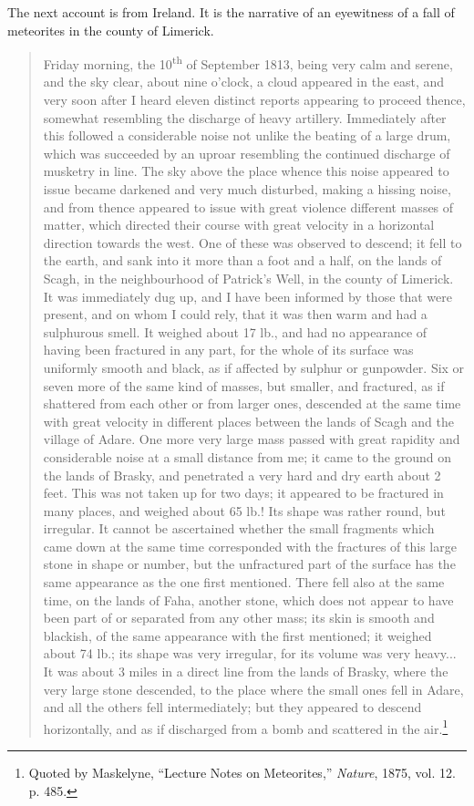 \documentclass[a4paper, 12pt, oneside, polutonikogreek, english]{article}
\begin{document}
The next account is from Ireland. It is the narrative of an eyewitness of a fall of meteorites in the county of Limerick.
\begin{quotation}
Friday morning, the 10\textsuperscript{th} of September 1813, being very calm and serene, and the sky clear, about nine o'clock, a cloud appeared in the east, and very soon after I heard eleven distinct reports appearing to proceed thence, somewhat resembling the discharge of heavy artillery. Immediately after this followed a considerable noise not unlike the beating of a large drum, which was succeeded by an uproar resembling the continued discharge of musketry in line. The sky above the place whence this noise appeared to issue became darkened and very much disturbed, making a hissing noise, and from thence appeared to issue with great violence different masses of matter, which directed their course with great velocity in a horizontal direction towards the west. One of these was observed to descend; it fell to the earth, and sank into it more than a foot and a half, on the lands of Scagh, in the neighbourhood of Patrick's Well, in the county of Limerick. It was immediately dug up, and I have been informed by those that were present, and on whom I could rely, that it was then warm and had a sulphurous smell. It weighed about 17 lb., and had no appearance of having been fractured in any part, for the whole of its surface was uniformly smooth and black, as if affected by sulphur or gunpowder. Six or seven more of the same kind of masses, but smaller, and fractured, as if shattered from each other or from larger ones, descended at the same time with great velocity in different places between the lands of Scagh and the village of Adare. One more very large mass passed with great rapidity and considerable noise at a small distance from me; it came to the ground on the lands of Brasky, and penetrated a very hard and dry earth about 2 feet. This was not taken up for two days; it appeared to be fractured in many places, and weighed about 65 lb.! Its shape was rather round, but irregular. It cannot be ascertained whether the small fragments which came down at the same time corresponded with the fractures of this large stone in shape or number, but the unfractured part of the surface has the same appearance as the one first mentioned. There fell also at the same time, on the lands of Faha, another stone, which does not appear to have been part of or separated from any other mass; its skin is smooth and blackish, of the same appearance with the first mentioned; it weighed about 74 lb.; its shape was very irregular, for its volume was very heavy... It was about 3 miles in a direct line from the lands of Brasky, where the very large stone descended, to the place where the small ones fell in Adare, and all the others fell intermediately; but they appeared to descend horizontally, and as if discharged from a bomb and scattered in the air.\footnote{Quoted by Maskelyne, ``Lecture Notes on Meteorites,'' \emph{Nature}, 1875, vol. 12. p. 485.}
\end{quotation}
\end{document}
